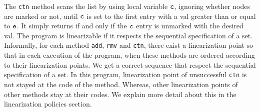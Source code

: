 The {\tt ctn} method scans the list by using local variable $\tt c$, ignoring whether nodes are marked or not, until $\tt c$ is set to the
first entry with a val greater than or equal to $\tt e$. It simply returns \true \; if and only if the $\tt c$ entry is unmarked with the desired val. The program is linearizable if it respects the sequential specification of a set. Informally, for each method {\tt add}, {\tt rmv} and {\tt ctn}, there exist a linearization point so that in each execution of the program, when these methods are ordered according to their linearization points. We get a correct sequence that respect the sequential specification of a set.  In this program, linearization point of unsuccessful {\tt ctn} is not stayed at the code of the method. Whereas, other linearization points of other methods stay at their codes. We explain more detail about this in the linearization policies section. 
%    
%
%    
%    
%        
%    
%    

